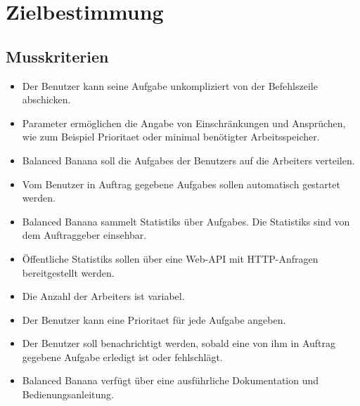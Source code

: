 \documentclass[a4paper,12pt]{article}
\begin{document}
\clearpage
\section{Zielbestimmung}
\subsection{Musskriterien}
\begin{itemize}[nosep]
	
	\item Der \gls{Benutzer} kann seine \gls{Aufgabe} unkompliziert von der \gls{Befehlszeile} abschicken.
	
	\item \gls{Parameter} ermöglichen die Angabe von Einschränkungen und Ansprüchen, wie zum Beispiel \gls{Prioritaet} oder minimal benötigter Arbeitsspeicher.
		
	\item Balanced Banana soll die \glspl{Aufgabe} der \glspl{Benutzer} auf die \glspl{Arbeiter} verteilen.
	
	\item Vom \gls{Benutzer} in Auftrag gegebene \glspl{Aufgabe} sollen automatisch gestartet werden.
	
	\item Balanced Banana sammelt \glspl{Statistik} über \glspl{Aufgabe}. Die \glspl{Statistik} sind von dem \gls{Auftraggeber} einsehbar.
	
	\item Öffentliche \glspl{Statistik} sollen über eine \gls{Web-API} mit \gls{HTTP-Anfragen} bereitgestellt werden.
	
	\item Die Anzahl der \glspl{Arbeiter} ist variabel.
	
	\item Der \gls{Benutzer} kann eine \gls{Prioritaet} für jede \gls{Aufgabe} angeben.
	
	\item Der \gls{Benutzer} soll benachrichtigt werden, sobald eine von ihm in Auftrag gegebene \gls{Aufgabe} erledigt ist oder fehlschlägt.
	
	
	\item Balanced Banana verfügt über eine ausführliche Dokumentation und Bedienungsanleitung.

\end{itemize}
\end{document}
